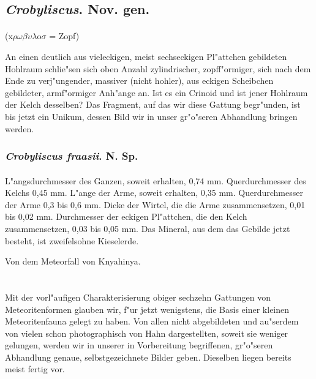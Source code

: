 \documentclass[a4paper, 11pt, oneside]{article}
\begin{document}
\subsection{\emph{Crobyliscus}. Nov. gen.}
\paragraph{}
(x$\rho\omega\beta\upsilon\lambda$o$\sigma$ = Zopf)%

An einen deutlich aus vieleckigen, meist sechseckigen Pl"attchen gebildeten Hohlraum schlie"sen sich oben Anzahl zylindrischer, zopff"ormiger, sich nach dem Ende zu verj"ungender, massiver (nicht hohler), aus eckigen Scheibchen gebildeter, armf"ormiger Anh"ange an. Ist es ein Crinoid und ist jener Hohlraum der Kelch desselben? Das Fragment, auf das wir diese Gattung begr"unden, ist bis jetzt ein Unikum, dessen Bild wir in unser gr"o"seren Abhandlung bringen werden.
\subsubsection{\emph{Crobyliscus fraasii}. N. Sp.}
\paragraph{}
L"angsdurchmesser des Ganzen, soweit erhalten, 0,74 mm. Querdurchmesser des Kelchs 0,45 mm. L"ange der Arme, soweit erhalten, 0,35 mm. Querdurchmesser der Arme 0,3 bis 0,6 mm. Dicke der Wirtel, die die Arme zusammensetzen, 0,01 bis 0,02 mm. Durchmesser der eckigen Pl"attchen, die den Kelch zusammensetzen, 0,03 bis 0,05 mm. Das Mineral, aus dem das Gebilde jetzt besteht, ist zweifelsohne Kieselerde.

Von dem Meteorfall von Knyahinya.
\clearpage
\section{}
\paragraph{}
Mit der vorl"aufigen Charakterisierung obiger sechzehn Gattungen von Meteoritenformen glauben wir, f"ur jetzt wenigstens, die Basis einer kleinen Meteoritenfauna gelegt zu haben. Von allen nicht abgebildeten und au"serdem von vielen schon photographisch von Hahn dargestellten, soweit sie weniger gelungen, werden wir in unserer in Vorbereitung begriffenen, gr"o"seren Abhandlung genaue, selbstgezeichnete Bilder geben. Dieselben liegen bereits meist fertig vor.
\end{document}
